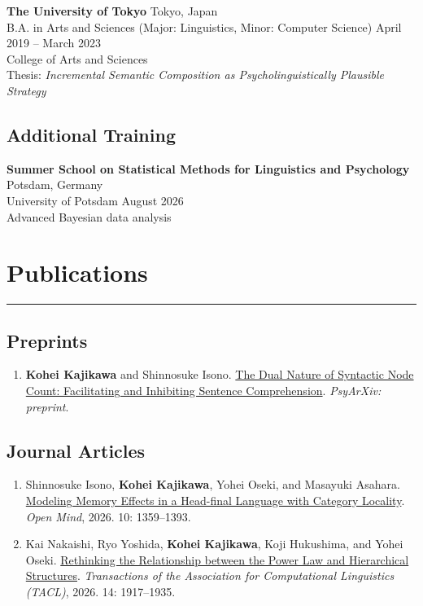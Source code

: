 \documentclass[10pt,a4paper]{article}
\newcommand{\entrygap}{\vspace{6pt}}
\newcommand{\rulegap}{\vspace{6pt}}
\begin{document}
\entrygap

\textbf{The University of Tokyo}
\hfill{Tokyo, Japan} \\
B.A. in Arts and Sciences (Major: Linguistics, Minor: Computer Science)
\hfill{April 2019 -- March 2023} \\
College of Arts and Sciences \\
Thesis: \textit{Incremental Semantic Composition as Psycholinguistically Plausible Strategy}



\subsection*{Additional Training}
\textbf{Summer School on Statistical Methods for Linguistics and Psychology}
\hfill{Potsdam, Germany} \\
University of Potsdam
\hfill{August 2026} \\
Advanced Bayesian data analysis 

\section*{Publications}
\hrule
\rulegap

\subsection*{Preprints}
\begin{enumerate}
    \item \textbf{Kohei Kajikawa} and Shinnosuke Isono. \href{https://osf.io/preprints/psyarxiv/9msby_v2}{The Dual Nature of Syntactic Node Count: Facilitating and Inhibiting Sentence Comprehension}. \textit{PsyArXiv: preprint}.
\end{enumerate}

\subsection*{Journal Articles}
\begin{enumerate}
    \item Shinnosuke Isono, \textbf{Kohei Kajikawa}, Yohei Oseki, and Masayuki Asahara. \href{https://direct.mit.edu/opmi/article/doi/10.1162/OPMI.a.384/138851/Modeling-Memory-Effects-in-a-Head-Final-Language}{Modeling Memory Effects in a Head-final Language with Category Locality}. \textit{Open Mind}, 2026. 10: 1359--1393.
    \item Kai Nakaishi, Ryo Yoshida, \textbf{Kohei Kajikawa}, Koji Hukushima, and Yohei Oseki. \href{https://direct.mit.edu/tacl/article/doi/10.1162/TACL.a.785/138664}{Rethinking the Relationship between the Power Law and Hierarchical Structures}. \textit{Transactions of the Association for Computational Linguistics (TACL)}, 2026. 14: 1917--1935.
\end{enumerate}
\end{document}
